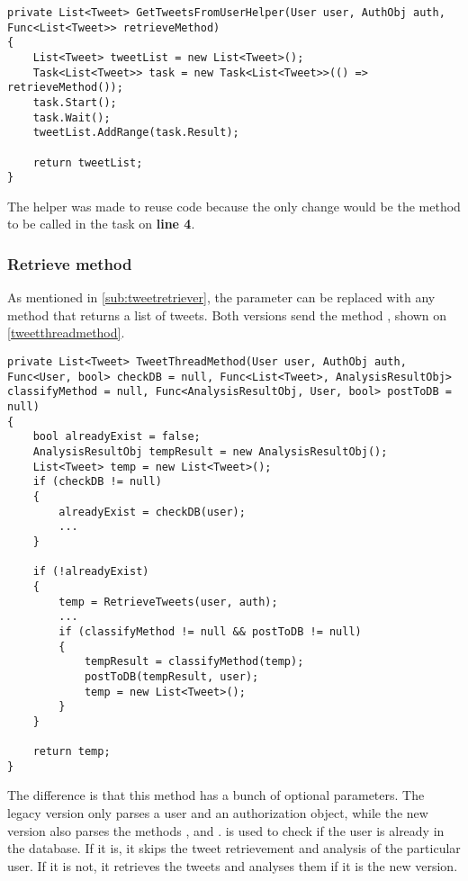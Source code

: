 \begin{minipage}[H]{\linewidth}
\begin{lstlisting}[caption = The GetTweetsFromUserHelper., label =
UserTweetHelper]
private List<Tweet> GetTweetsFromUserHelper(User user, AuthObj auth, Func<List<Tweet>> retrieveMethod)
{
    List<Tweet> tweetList = new List<Tweet>();
    Task<List<Tweet>> task = new Task<List<Tweet>>(() => retrieveMethod());
    task.Start();
    task.Wait();
    tweetList.AddRange(task.Result);

    return tweetList;
}
\end{lstlisting}
\end{minipage}

The helper was made to reuse code because the only change would be the method
to be called in the task on \textbf{line 4}.\\

\subsubsection{Retrieve method}
As mentioned in \autoref{sub:tweetretriever}, the 
parameter can be replaced with any method that returns a list of tweets. Both
versions send the method , shown on
\autoref{tweetthreadmethod}. \\

\begin{minipage}[H]{\linewidth}
\begin{lstlisting}[caption = The TweetThreadMethod function., label =
tweetthreadmethod]
private List<Tweet> TweetThreadMethod(User user, AuthObj auth, Func<User, bool> checkDB = null, Func<List<Tweet>, AnalysisResultObj> classifyMethod = null, Func<AnalysisResultObj, User, bool> postToDB = null)
{
    bool alreadyExist = false;
    AnalysisResultObj tempResult = new AnalysisResultObj();
    List<Tweet> temp = new List<Tweet>();
    if (checkDB != null)
    {
        alreadyExist = checkDB(user);
		...
    }

    if (!alreadyExist)
    {
        temp = RetrieveTweets(user, auth);
		...	
        if (classifyMethod != null && postToDB != null)
        {
            tempResult = classifyMethod(temp); 
            postToDB(tempResult, user); 
            temp = new List<Tweet>();
        }
    }

    return temp;
}
\end{lstlisting}

\end{minipage}
The difference is that this method has a bunch of optional parameters. The
legacy version only parses a user and an authorization object, while the new
version also parses the methods ,  and
.
 is used to check if the user is already in the database. If it
is, it skips the tweet retrievement and analysis of the particular user. If it
is not, it retrieves the tweets and analyses them if it is the new version.\\

